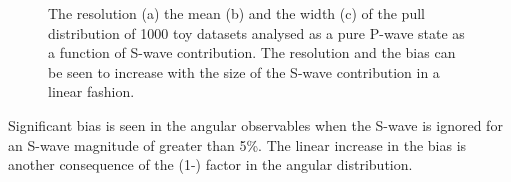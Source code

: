 \begin{figure}[tb]
\centering
{}
\caption[ The resolution, mean and width of the pull distribution 
of 1000 toy datasets analysed as a pure 
P-wave state as a function of the S-wave contribution.   ]
{The resolution (a) the mean (b) and the width (c) of the pull distribution
of 1000 toy datasets analysed as a pure 
P-wave state as a function of S-wave contribution. 
The resolution and the bias can be seen to increase with the size of the S-wave 
contribution in a linear fashion. ~\label{fig:fsval}}
\end{figure}
Significant bias is seen in the angular 
observables when the S-wave is ignored for an S-wave magnitude of greater than 5\%.
The linear increase in the bias 
is another consequence of the (1-\FS) factor in the angular distribution.

